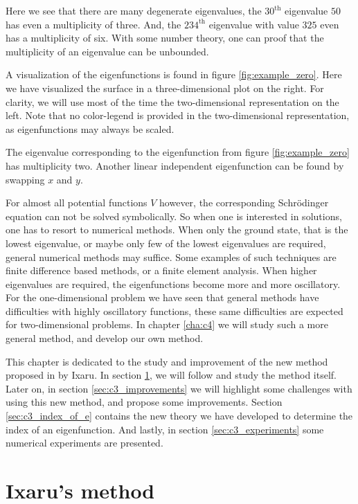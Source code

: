 \begin{example}
    Here we see that there are many degenerate eigenvalues, the $30^\text{th}$ eigenvalue $50$ has even a multiplicity of three. And, the $234^\text{th}$ eigenvalue with value $325$ even has a multiplicity of six. With some number theory, one can proof that the multiplicity of an eigenvalue can be unbounded.

    A visualization of the eigenfunctions is found in figure \ref{fig:example_zero}. Here we have visualized the surface in a three-dimensional plot on the right. For clarity, we will use most of the time the two-dimensional representation on the left. Note that no color-legend is provided in the two-dimensional representation, as eigenfunctions may always be scaled.

    The eigenvalue corresponding to the eigenfunction from figure \ref{fig:example_zero} has multiplicity two. Another linear independent eigenfunction can be found by swapping $x$ and $y$.
\end{example}

For almost all potential functions $V$ however, the corresponding Schrödinger equation can not be solved symbolically. So when one is interested in solutions, one has to resort to numerical methods. When only the ground state, that is the lowest eigenvalue, or maybe only few of the lowest eigenvalues are required, general numerical methods may suffice. Some examples of such techniques are finite difference based methods, or a finite element analysis. When higher eigenvalues are required, the eigenfunctions become more and more oscillatory. For the one-dimensional problem we have seen that general methods have difficulties with highly oscillatory functions, these same difficulties are expected for two-dimensional problems. In chapter \ref{cha:c4} we will study such a more general method, and develop our own method.

This chapter is dedicated to the study and improvement of the new method proposed in \cite{ixaru_new_2010} by Ixaru. In section \ref{sec:c3_ixarus_method}, we will follow \cite{ixaru_new_2010} and study the method itself. Later on, in section \ref{sec:c3_improvements} we will highlight some challenges with using this new method, and propose some improvements. Section \ref{sec:c3_index_of_e} contains the new theory we have developed to determine the index of an eigenfunction. And lastly, in section \ref{sec:c3_experiments} some numerical experiments are presented.

\section{Ixaru's method}\label{sec:c3_ixarus_method}

